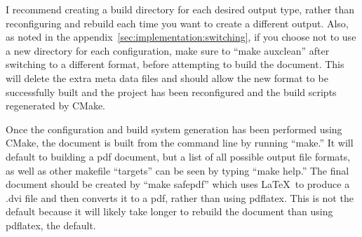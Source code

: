 I recommend creating a build directory for each desired output type,
rather than reconfiguring and rebuild each time you want to create a
different output. Also, as noted in the
appendix~\ref{sec:implementation:switching}, if you choose not to use
a new directory for each configuration, make sure to ``make auxclean''
after switching to a different format, before attempting to build the
document. This will delete the extra meta data files and should
allow the new format to be successfully built and the project has been
reconfigured and the build scripts regenerated by CMake.

Once the configuration and build system generation has been performed
using CMake, the document is built from the command line by running
``make.'' It will default to building a pdf document, but a list of
all possible output file formats, as well as other makefile
``targets'' can be seen by typing ``make help.'' The
final document should be created by ``make safepdf'' which uses \LaTeX\ to
produce a .dvi file and then converts it to a pdf, rather than using
pdflatex. This is not the default because it will likely take longer
to rebuild the document than using pdflatex, the default.

